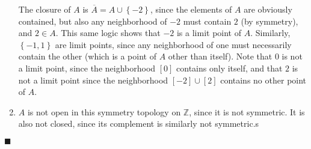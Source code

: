 \documentclass[12pt]{article}
\renewcommand{\qed}{\hfill$\blacksquare$}
\renewenvironment{proof}{\begin{addmargin}[1em]{0em}\begin{newproof}}{\end{newproof}\end{addmargin}\qed}
\begin{document}
\begin{proof}
\begin{enumerate}[label=(\alph*)]
	The closure of $A$ is $\overline{A} = A\cup\left\{-2\right\}$, since the elements of $A$ are obviously contained, but also any neighborhood of $-2$ must contain $2$ (by symmetry), and $2\in A$. This same logic shows that $-2$ is a limit point of $A$. Similarly, $\left\{-1,1\right\}$ are limit points, since any neighborhood of one must necessarily contain the other (which is a point of $A$ other than itself). Note that $0$ is not a limit point, since the neighborhood $\left[0\right]$ contains only itself, and that $2$ is not a limit point since the neighborhood $\left[-2\right]\cup\left[2\right]$ contains no other point of $A$.
	
	\item $A$ is not open in this symmetry topology on $\mathbb{Z}$, since it is not symmetric. It is also not closed, since its complement is similarly not symmetric.s
\end{enumerate}
\end{proof}
\end{document}
